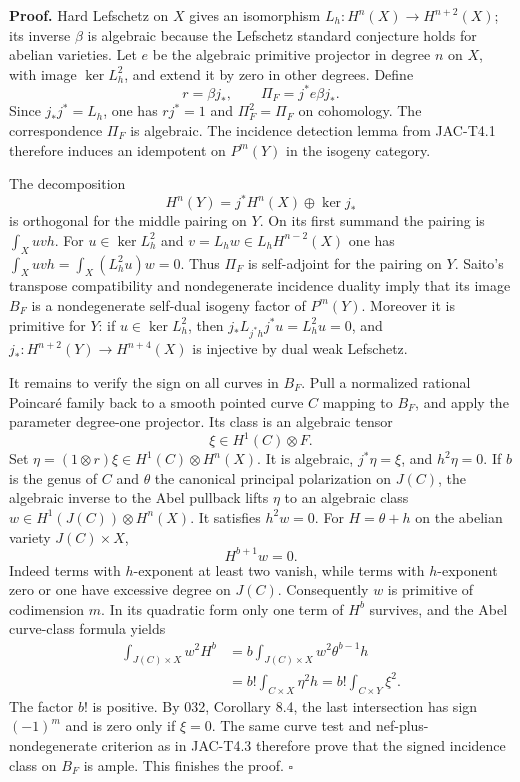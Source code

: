 \textbf{Proof.}
Hard Lefschetz on $X$ gives an isomorphism
$L_h:H^n(X)\to H^{n+2}(X)$; its inverse $\beta$ is algebraic because
the Lefschetz standard conjecture holds for abelian varieties. Let $e$
be the algebraic primitive projector in degree $n$ on $X$, with image
$\ker L_h^2$, and extend it by zero in other degrees. Define
\[
 r=\beta j_*,\qquad \Pi_F=j^*e\beta j_*.
\]
Since $j_*j^*=L_h$, one has $rj^*=1$ and $\Pi_F^2=\Pi_F$ on
cohomology. The correspondence $\Pi_F$ is algebraic. The incidence
detection lemma from JAC-T4.1 therefore induces an idempotent on
$P^m(Y)$ in the isogeny category.

The decomposition
\[
 H^n(Y)=j^*H^n(X)\oplus\ker j_*
\]
is orthogonal for the middle pairing on $Y$. On its first summand the
pairing is $\int_X uvh$. For $u\in\ker L_h^2$ and
$v=L_hw\in L_hH^{n-2}(X)$ one has
$\int_Xuvh=\int_X(L_h^2u)w=0$. Thus $\Pi_F$ is self-adjoint for
the pairing on $Y$. Saito's transpose compatibility and nondegenerate
incidence duality imply that its image $B_F$ is a nondegenerate
self-dual isogeny factor of $P^m(Y)$. Moreover it is primitive for $Y$:
if $u\in\ker L_h^2$, then
$j_*L_{j^*h}j^*u=L_h^2u=0$, and
$j_*:H^{n+2}(Y)\to H^{n+4}(X)$ is injective by dual weak Lefschetz.

It remains to verify the sign on all curves in $B_F$. Pull a normalized
rational Poincar\'e family back to a smooth pointed curve $C$ mapping to
$B_F$, and apply the parameter degree-one projector. Its class is an
algebraic tensor
\[
 \xi\in H^1(C)\otimes F.
\]
Set $\eta=(1\otimes r)\xi\in H^1(C)\otimes H^n(X)$.
It is algebraic, $j^*\eta=\xi$, and $h^2\eta=0$.
If $b$ is the genus of $C$ and $\theta$ the canonical principal
polarization on $J(C)$, the algebraic inverse to the Abel pullback
lifts $\eta$ to an algebraic class
$w\in H^1(J(C))\otimes H^n(X)$. It satisfies $h^2w=0$.
For $H=\theta+h$ on the abelian variety $J(C)\times X$,
\[
 H^{b+1}w=0.
\]
Indeed terms with $h$-exponent at least two vanish, while terms with
$h$-exponent zero or one have excessive degree on $J(C)$.
Consequently $w$ is primitive of codimension $m$. In its quadratic form
only one term of $H^b$ survives, and the Abel curve-class formula yields
\[
 \begin{aligned}
 \int_{J(C)\times X}w^2H^b
 &=b\int_{J(C)\times X}w^2\theta^{b-1}h\\
 &=b!\int_{C\times X}\eta^2h
 =b!\int_{C\times Y}\xi^2.
 \end{aligned}                                                \tag{H9.9}
\]
The factor $b!$ is positive. By 032, Corollary 8.4, the last intersection
has sign $(-1)^m$ and is zero only if $\xi=0$. The same curve test and
nef-plus-nondegenerate criterion as in JAC-T4.3 therefore prove that
the signed incidence class on $B_F$ is ample. This finishes the proof.
\hfill$\square$

